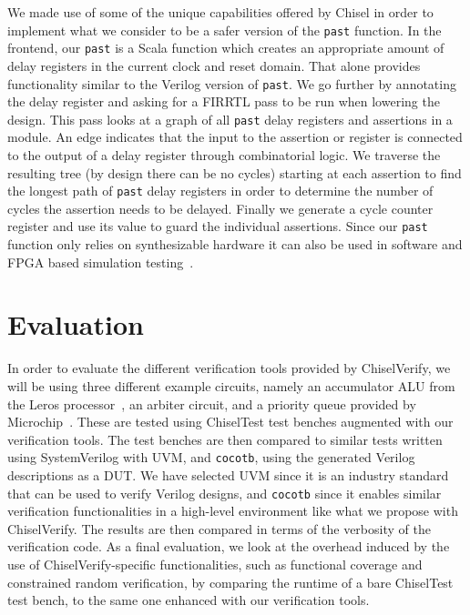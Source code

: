 \documentclass[conference]{IEEEtran}
\newcommand{\code}[1]{{\small{\texttt{#1}}}}
\begin{document}
We made use of some of the unique capabilities offered by Chisel in order to implement what we consider to be a safer version of the
\code{past} function.
In the frontend, our \code{past} is a Scala function which creates an appropriate amount of delay registers in the current
clock and reset domain. That alone provides functionality similar to the Verilog version of \code{past}.
We go further by annotating the delay register and asking for a FIRRTL pass to be run when lowering the design.
This pass looks at a graph of all \code{past} delay registers and assertions in a module.
An edge indicates that the input to the assertion or register is connected to the output of a delay register through combinatorial logic.
We traverse the resulting tree (by design there can be no cycles) starting at each assertion
to find the longest path of \code{past} delay registers in order to determine the number of cycles the assertion needs to be delayed.
Finally we generate a cycle counter register and use its value to guard the individual assertions.
Since our \code{past} function only relies on synthesizable hardware it can also be used in software and FPGA based
simulation testing~\cite{karandikar2018firesim}.


\section{Evaluation}
\label{sec:eval}

In order to evaluate the different verification tools provided by ChiselVerify, we will be using three different example circuits, namely an accumulator ALU from the Leros processor~\cite{leros:arcs2019}, an arbiter circuit, and a priority queue provided by Microchip~\cite{microchip}.
These are tested using ChiselTest test benches augmented with our verification tools.
The test benches are then compared to similar tests written using SystemVerilog with UVM, and \texttt{cocotb}, using the generated Verilog descriptions as a DUT.
We have selected UVM since it is an industry standard that can be used to verify Verilog designs, and \texttt{cocotb} since it enables similar verification functionalities in a high-level environment like what we propose with ChiselVerify.
The results are then compared in terms of the verbosity of the verification code.
As a final evaluation, we look at the overhead induced by the use of ChiselVerify-specific functionalities, such as functional coverage and constrained random verification, by comparing the runtime of a bare ChiselTest test bench, to the same one enhanced with our verification tools.
\end{document}
